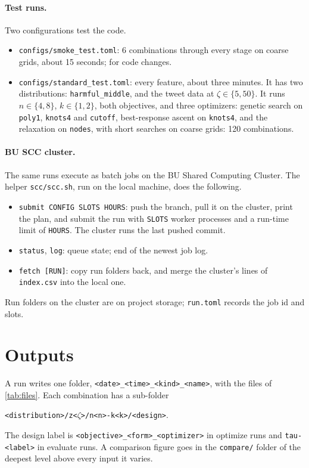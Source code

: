 \documentclass[11pt]{article}
\newcommand{\code}[1]{\texttt{#1}}
\begin{document}
\paragraph{Test runs.} Two configurations test the code.
\begin{itemize}
    \item \code{configs/smoke\_test.toml}: 6 combinations through every stage on coarse grids, about 15 seconds; for code changes.
    \item \code{configs/standard\_test.toml}: every feature, about three minutes. It has two distributions: \code{harmful\_middle}, and the tweet data at $\zeta\in\{5,50\}$. It runs $n\in\{4,8\}$, $k\in\{1,2\}$, both objectives, and three optimizers: genetic search on \code{poly1}, \code{knots4} and \code{cutoff}, best-response ascent on \code{knots4}, and the relaxation on \code{nodes}, with short searches on coarse grids: 120 combinations.
\end{itemize}

\paragraph{BU SCC cluster.} The same runs execute as batch jobs on the BU Shared Computing Cluster. The helper \code{scc/scc.sh}, run on the local machine, does the following.
\begin{itemize}
    \item \code{submit CONFIG SLOTS HOURS}: push the branch, pull it on the cluster, print the plan, and submit the run with \code{SLOTS} worker processes and a run-time limit of \code{HOURS}. The cluster runs the last pushed commit.
    \item \code{status}, \code{log}: queue state; end of the newest job log.
    \item \code{fetch [RUN]}: copy run folders back, and merge the cluster's lines of \code{index.csv} into the local one.
\end{itemize}
Run folders on the cluster are on project storage; \code{run.toml} records the job id and slots.

\section{Outputs}\label{sec:outputs}

A run writes one folder, \code{<date>\_<time>\_<kind>\_<name>}, with the files of \cref{tab:files}. Each combination has a sub-folder
\begin{center}
\code{<distribution>/z<$\zeta$>/n<n>-k<k>/<design>}.
\end{center}
The design label is \code{<objective>\_<form>\_<optimizer>} in optimize runs and \code{tau-<label>} in evaluate runs. A comparison figure goes in the \code{compare/} folder of the deepest level above every input it varies.
\end{document}
